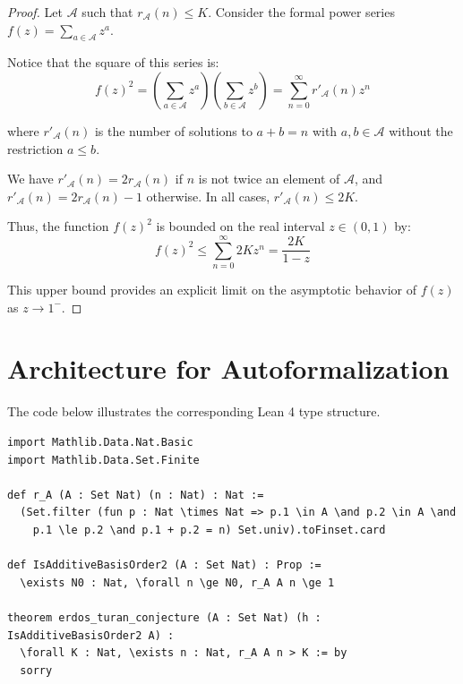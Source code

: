 \documentclass[11pt,a4paper]{article}
\begin{document}
\begin{proof}
Let $\mathcal{A}$ such that $r_{\mathcal{A}}(n) \le K$. Consider the formal power series $f(z) = \sum_{a \in \mathcal{A}} z^a$.

Notice that the square of this series is:
\begin{equation*}
f(z)^2 = \left( \sum_{a \in \mathcal{A}} z^a \right) \left( \sum_{b \in \mathcal{A}} z^b \right) = \sum_{n=0}^{\infty} r'_{\mathcal{A}}(n) z^n
\end{equation*}

where $r'_{\mathcal{A}}(n)$ is the number of solutions to $a+b=n$ with $a,b \in \mathcal{A}$ without the restriction $a \le b$.

We have $r'_{\mathcal{A}}(n) = 2 r_{\mathcal{A}}(n)$ if $n$ is not twice an element of $\mathcal{A}$, and $r'_{\mathcal{A}}(n) = 2 r_{\mathcal{A}}(n) - 1$ otherwise. In all cases, $r'_{\mathcal{A}}(n) \le 2K$.

Thus, the function $f(z)^2$ is bounded on the real interval $z \in (0,1)$ by:
\begin{equation*}
f(z)^2 \le \sum_{n=0}^{\infty} 2K z^n = \frac{2K}{1-z}
\end{equation*}

This upper bound provides an explicit limit on the asymptotic behavior of $f(z)$ as $z \to 1^-$.


\end{proof}

\section{Architecture for Autoformalization}
The code below illustrates the corresponding Lean 4 type structure.

\begin{verbatim}
import Mathlib.Data.Nat.Basic
import Mathlib.Data.Set.Finite

def r_A (A : Set Nat) (n : Nat) : Nat :=
  (Set.filter (fun p : Nat \times Nat => p.1 \in A \and p.2 \in A \and
    p.1 \le p.2 \and p.1 + p.2 = n) Set.univ).toFinset.card

def IsAdditiveBasisOrder2 (A : Set Nat) : Prop :=
  \exists N0 : Nat, \forall n \ge N0, r_A A n \ge 1

theorem erdos_turan_conjecture (A : Set Nat) (h : IsAdditiveBasisOrder2 A) :
  \forall K : Nat, \exists n : Nat, r_A A n > K := by
  sorry
\end{verbatim}
\end{document}
